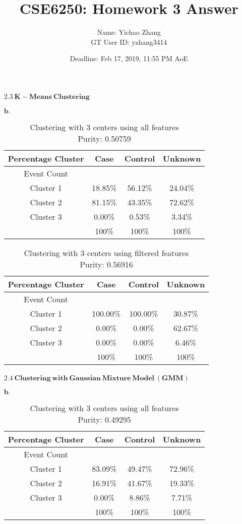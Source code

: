 \documentclass[12pt]{article}
\title{CSE6250: Homework 3 Answer}
\author{Name: Yichao Zhang\\ GT User ID: yzhang3414}
\date{Deadline: Feb 17, 2019, 11:55 PM AoE}
\begin{document}
\maketitle

$\mathbf{2.3 \ K-Means \ Clustering}$ 
$\mathbf{}$

$\mathbf{b.}$
\begin{table}[th]
\centering
\begin{tabular}{@{}c|c|c|c}
\hline
Percentage Cluster & Case & Control & Unknown  \\ \hline
Event Count & & &  \\ 
Cluster 1 & 18.85\% & 56.12\%  & 24.04\%\\
Cluster 2  & 81.15\%  & 43.35\% & 72.62\%\\
Cluster 3  & 0.00\%  & 0.53\%  & 3.34\% \\ \hline
  & 100\%  & 100\%  & 100\% \\ \hline
\end{tabular}
\caption{Clustering with 3 centers using all features \\ Purity:  0.50759}
\end{table} 

\begin{table}[th]
\centering
\begin{tabular}{@{}c|c|c|c}
\hline
Percentage Cluster & Case & Control & Unknown  \\ \hline
Event Count & & &  \\ 
Cluster 1 & 100.00\% & 100.00\%  & 30.87\%\\
Cluster 2  & 0.00\%  & 0.00\% & 62.67\%\\
Cluster 3  & 0.00\%  & 0.00\%  & 6.46\% \\ \hline
  & 100\%  & 100\%  & 100\% \\ \hline
\end{tabular}
\caption{Clustering with 3 centers using filtered features \\ Purity: 0.56916}
\end{table} 



\newpage
$\mathbf{2.4 \ Clustering \ with \ Gaussian \ Mixture \ Model \ (GMM)}$
$\mathbf{}$

$\mathbf{b.}$

\begin{table}[th]
\centering
\begin{tabular}{@{}c|c|c|c}
\hline
Percentage Cluster & Case & Control & Unknown  \\ \hline
Event Count & & &  \\ 
Cluster 1 & 83.09\% & 49.47\%  & 72.96\%\\
Cluster 2  & 16.91\%  & 41.67\% & 19.33\%\\
Cluster 3  & 0.00\%  & 8.86\%  & 7.71\% \\ \hline
  & 100\%  & 100\%  & 100\% \\ \hline
\end{tabular}
\caption{Clustering with 3 centers using all features\\ Purity: 0.49295}
\end{table} 
\end{document}
